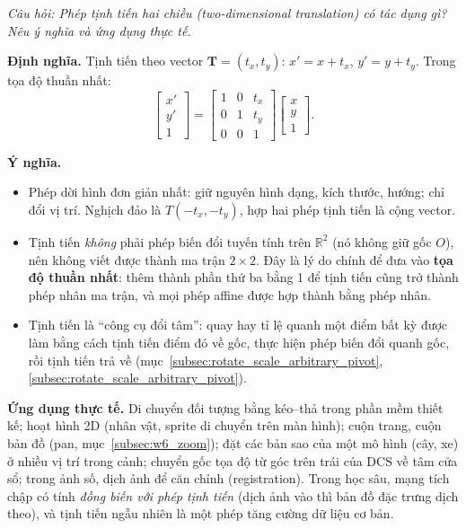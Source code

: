 \textit{Câu hỏi: Phép tịnh tiến hai chiều (two-dimensional translation) có tác dụng gì? Nêu ý nghĩa và ứng dụng thực tế.}

\textbf{Định nghĩa.} Tịnh tiến theo vector $\mathbf{T} = (t_x, t_y)$: $x' = x + t_x$, $y' = y + t_y$. Trong tọa độ thuần nhất:
\begin{equation}
\begin{bmatrix} x' \\ y' \\ 1 \end{bmatrix} =
\begin{bmatrix} 1 & 0 & t_x \\ 0 & 1 & t_y \\ 0 & 0 & 1 \end{bmatrix}
\begin{bmatrix} x \\ y \\ 1 \end{bmatrix}.
\end{equation}

\textbf{Ý nghĩa.}
\begin{itemize}
    \item Phép dời hình đơn giản nhất: giữ nguyên hình dạng, kích thước, hướng; chỉ đổi vị trí. Nghịch đảo là $T(-t_x, -t_y)$, hợp hai phép tịnh tiến là cộng vector.
    \item Tịnh tiến \emph{không} phải phép biến đổi tuyến tính trên $\mathbb{R}^2$ (nó không giữ gốc $O$), nên không viết được thành ma trận $2 \times 2$. Đây là lý do chính để đưa vào \textbf{tọa độ thuần nhất}: thêm thành phần thứ ba bằng 1 để tịnh tiến cũng trở thành phép nhân ma trận, và mọi phép affine được hợp thành bằng phép nhân.
    \item Tịnh tiến là ``công cụ đổi tâm'': quay hay tỉ lệ quanh một điểm bất kỳ được làm bằng cách tịnh tiến điểm đó về gốc, thực hiện phép biến đổi quanh gốc, rồi tịnh tiến trả về (mục~\ref{subsec:rotate_scale_arbitrary_pivot}, \ref{subsec:rotate_scale_arbitrary_pivot}).
\end{itemize}

\textbf{Ứng dụng thực tế.} Di chuyển đối tượng bằng kéo--thả trong phần mềm thiết kế; hoạt hình 2D (nhân vật, sprite di chuyển trên màn hình); cuộn trang, cuộn bản đồ (pan, mục~\ref{subsec:w6_zoom}); đặt các bản sao của một mô hình (cây, xe) ở nhiều vị trí trong cảnh; chuyển gốc tọa độ từ góc trên trái của DCS về tâm cửa sổ; trong ảnh số, dịch ảnh để căn chỉnh (registration). Trong học sâu, mạng tích chập có tính \emph{đồng biến với phép tịnh tiến} (dịch ảnh vào thì bản đồ đặc trưng dịch theo), và tịnh tiến ngẫu nhiên là một phép tăng cường dữ liệu cơ bản.

